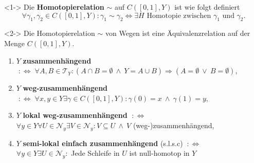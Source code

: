 \documentclass[12pt, aspectratio=169]{beamer}
\newcommand{\T}[0]{\mathcal{T}}
\newcommand{\NB}[0]{\mathcal{N}}
\begin{document}
\begin{frame}
    \begin{definition}<1->
        Die \textbf{Homotopierelation} $\sim$ auf $C([0,1], Y)$ ist wie folgt definiert 
        \begin{equation*}
          \forall\gamma_1, \gamma_2 \in C([0,1], Y)\colon \gamma_1 \sim \gamma_2 \iff \exists H \text{ Homotopie zwischen } \gamma_1 \text{ und } \gamma_2.
        \end{equation*}
    \end{definition}
    \begin{lemma}<2->
        Die Homotopierelation $\sim$ von Wegen ist eine Äquivalenzrelation auf der Menge $C([0,1],Y)$.
    \end{lemma}
\end{frame}

\begin{frame}
    \centering
\end{frame}

\begin{frame}
\begin{definition}
    \begin{enumerate}
        \item $Y$ \textbf{zusammenhängend} $\;:\Longleftrightarrow\; \forall A,B \in \T_Y\colon (A \cap B = \emptyset \: \land \: Y = A \cup B) \Rightarrow (A = \emptyset \: \lor \: B = \emptyset)$,
        \item $Y$ \textbf{weg-zusammenhängend} $\;:\Longleftrightarrow\; \forall x,y \in Y \exists\gamma \in C([0,1], Y)\colon \gamma(0) = x \: \land \: \gamma(1) = y$,
        \item $Y$ \textbf{lokal weg-zusammenhängend} $\;:\Longleftrightarrow$ \\ $\forall y \in Y\forall U \in \NB_y\exists V\in \NB_y\colon V \subseteq U \: \land \: V$ (weg-)zusammenhängend,
        \item $Y$ \textbf{semi-lokal einfach zusammenhängend} (s.l.s.c) $\: :\Longleftrightarrow$ \\ $\forall y\in Y\exists U \in \NB_y\colon$ Jede Schleife in $U$ ist null-homotop in $Y$
    \end{enumerate}
\end{definition}
\end{frame}
\end{document}
